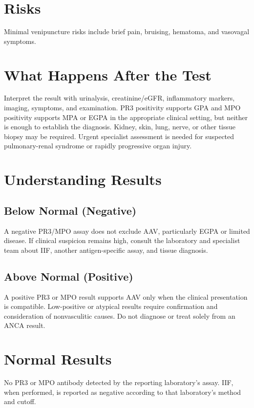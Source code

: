 \section*{Risks}
Minimal venipuncture risks include brief pain, bruising, hematoma, and vasovagal symptoms.

\section*{What Happens After the Test}
Interpret the result with urinalysis, creatinine/eGFR, inflammatory markers, imaging, symptoms, and examination. PR3 positivity supports GPA and MPO positivity supports MPA or EGPA in the appropriate clinical setting, but neither is enough to establish the diagnosis. Kidney, skin, lung, nerve, or other tissue biopsy may be required. Urgent specialist assessment is needed for suspected pulmonary-renal syndrome or rapidly progressive organ injury.

\section*{Understanding Results}
\subsection*{Below Normal (Negative)}
A negative PR3/MPO assay does not exclude AAV, particularly EGPA or limited disease. If clinical suspicion remains high, consult the laboratory and specialist team about IIF, another antigen-specific assay, and tissue diagnosis.

\subsection*{Above Normal (Positive)}
A positive PR3 or MPO result supports AAV only when the clinical presentation is compatible. Low-positive or atypical results require confirmation and consideration of nonvasculitic causes. Do not diagnose or treat solely from an ANCA result.

\section*{Normal Results}
No PR3 or MPO antibody detected by the reporting laboratory's assay. IIF, when performed, is reported as negative according to that laboratory's method and cutoff.

